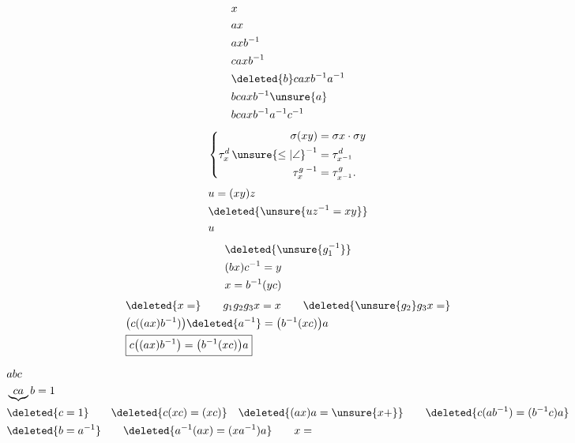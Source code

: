 \[
\begin{aligned}
&x\\&ax\\&axb^{-1}\\&caxb^{-1}\\&
\deleted{b}caxb^{-1}a^{-1}\\&bcaxb^{-1}\unsure{a}\\&bcaxb^{-1}a^{-1}c^{-1}
\end{aligned}
\]
\[
\left\{\begin{aligned}
\sigma(xy)&=\sigma x\cdot\sigma y\\
\tau_x^{d}\,{\unsure{\leq|\angle}}^{-1}&=\tau_{x^{-1}}^d\\
\tau_x^{g}\,{}^{-1}&=\tau_{x^{-1}}^g .
\end{aligned}\right.
\]
\[
\begin{aligned}
&u=(xy)z\\
&\deleted{\unsure{uz^{-1}=xy}}\\
&u
\end{aligned}
\]
\[
\begin{aligned}
&\deleted{\unsure{g_1^{-1}}}\\
&(bx)c^{-1}=y\\
&x=b^{-1}(yc)
\end{aligned}
\]
\[
\begin{aligned}
&\deleted{x=}\qquad g_1g_2g_3 x=x\qquad\deleted{\unsure{g_2}g_3x=}\\
&\bigl(c((ax)b^{-1})\bigr)\deleted{a^{-1}}=\bigl(b^{-1}(xc)\bigr)a\\
&\boxed{c\bigl((ax)b^{-1}\bigr)=\bigl(b^{-1}(xc)\bigr)a}
\end{aligned}
\]

\[
\begin{aligned}
&abc\\
&\underbrace{ca}b=1\\
&\deleted{c=1}\qquad \deleted{c(xc)=(xc)}\quad\deleted{(ax)a=\unsure{x+}} \qquad \deleted{c(ab^{-1})=(b^{-1}c)a}\\
&\deleted{b=a^{-1}}\qquad\deleted{a^{-1}(ax)=(xa^{-1})a}\qquad x=
\end{aligned}
\]
